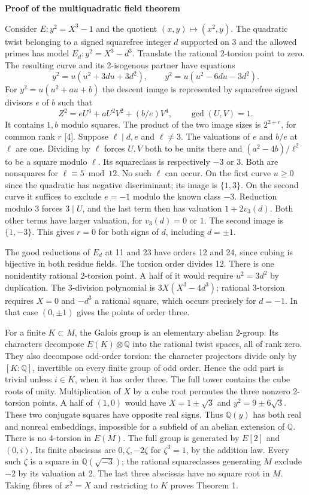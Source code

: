 \documentclass[12pt]{article}
\newcommand{\Q}{\mathbb Q}\newcommand{\Z}{\mathbb Z}
\newcommand{\head}[1]{{\Large\bfseries\color{ink}#1}\par\vspace{3pt}}
\begin{document}
\newpage
\head{Proof of the multiquadratic field theorem}
Consider $E:y^2=X^3-1$ and the quotient $(x,y)\mapsto (x^2,y)$. The quadratic twist belonging to a signed squarefree integer $d$ supported on 3 and the allowed primes has model $E_d:y^2=X^3-d^3$. Translate the rational 2-torsion point to zero. The resulting curve and its 2-isogenous partner have equations
\[
 y^2=u(u^2+3du+3d^2),\qquad y^2=u(u^2-6du-3d^2).
\]
For $y^2=u(u^2+au+b)$ the descent image is represented by squarefree signed divisors $e$ of $b$ such that
\[
 Z^2=eU^4+aU^2V^2+(b/e)V^4,\qquad \gcd(U,V)=1 .
\]
It contains $1,b$ modulo squares. The product of the two image sizes is $2^{2+r}$, for common rank $r$ [4]. Suppose $\ell\mid d,e$ and $\ell\ne3$. The valuations of $e$ and $b/e$ at $\ell$ are one. Dividing by $\ell$ forces $U,V$ both to be units there and $(a^2-4b)/\ell^2$ to be a square modulo $\ell$. Its squareclass is respectively $-3$ or $3$. Both are nonsquares for $\ell\equiv5\bmod12$. No such $\ell$ can occur. On the first curve $u\ge0$ since the quadratic has negative discriminant; its image is $\{1,3\}$. On the second curve it suffices to exclude $e=-1$ modulo the known class $-3$. Reduction modulo 3 forces $3\mid U$, and the last term then has valuation $1+2v_3(d)$. Both other terms have larger valuation, for $v_3(d)=0$ or $1$. The second image is $\{1,-3\}$. This gives $r=0$ for both signs of $d$, including $d=\pm1$.

The good reductions of $E_d$ at 11 and 23 have orders 12 and 24, since cubing is bijective in both residue fields. The torsion order divides 12. There is one nonidentity rational 2-torsion point. A half of it would require $u^2=3d^2$ by duplication. The 3-division polynomial is $3X(X^3-4d^3)$; rational 3-torsion requires $X=0$ and $-d^3$ a rational square, which occurs precisely for $d=-1$. In that case $(0,\pm1)$ gives the points of order three.

For a finite $K\subset M$, the Galois group is an elementary abelian 2-group. Its characters decompose $E(K)\otimes\Q$ into the rational twist spaces, all of rank zero. They also decompose odd-order torsion: the character projectors divide only by $[K:\Q]$, invertible on every finite group of odd order. Hence the odd part is trivial unless $i\in K$, when it has order three. The full tower contains the cube roots of unity. Multiplication of $X$ by a cube root permutes the three nonzero 2-torsion points. A half of $(1,0)$ would have $X=1\pm\sqrt3$ and $y^2=9\pm6\sqrt3$. These two conjugate squares have opposite real signs. Thus $\Q(y)$ has both real and nonreal embeddings, impossible for a subfield of an abelian extension of $\Q$. There is no 4-torsion in $E(M)$. The full group is generated by $E[2]$ and $(0,i)$. Its finite abscissas are $0,\zeta,-2\zeta$ for $\zeta^3=1$, by the addition law. Every such $\zeta$ is a square in $\Q(\sqrt{-3})$; the rational squareclasses generating $M$ exclude $-2$ by its valuation at 2. The last three abscissas have no square root in $M$. Taking fibres of $x^2=X$ and restricting to $K$ proves Theorem 1.
\end{document}
